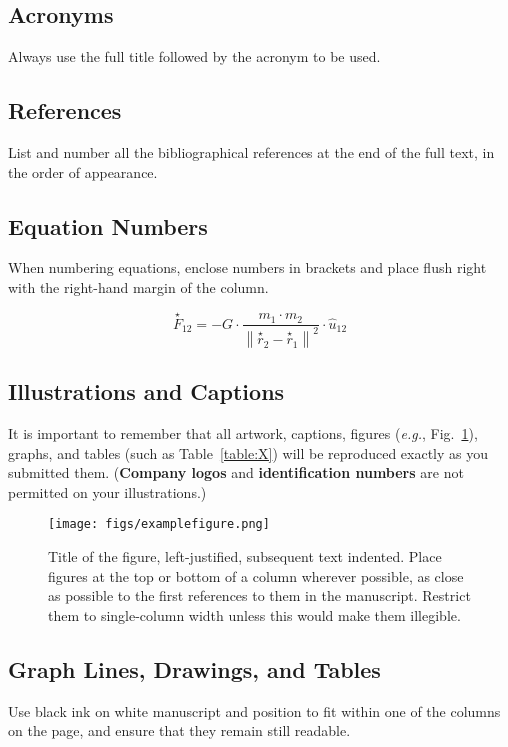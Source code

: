 \documentclass[fleqn]{iac}
\begin{document}
\subsection{Acronyms}
Always use the full title followed by the acronym to be used.

\subsection{References}
List and number all the bibliographical references at the end of the full text, in the order of appearance.\cite{IAFSecretariat2014}

\subsection{Equation Numbers}
When numbering equations, enclose numbers in brackets and place flush right with the right-hand margin of the column.

\begin{equation}
\stackrel{\star}{F}_{12} = -G \cdot \frac{ m_1 \cdot m_2 }{ \left\|\stackrel{\star}{r}_2 - \stackrel{\star}{r}_1\right\|^2 } \cdot \hat{u}_{12}
\end{equation}

\subsection{Illustrations and Captions}
It is important to remember that all artwork, captions, figures (\textit{e.g.}, Fig.~\ref{fig:X}), graphs, and tables (such as Table~\ref{table:X}) will be reproduced exactly as you submitted them. (\textbf{Company logos} and \textbf{identification numbers} are not permitted on your illustrations.)

\begin{figure}
\texttt{[image: figs/examplefigure.png]}
\caption{\label{fig:X}Title of the figure, left-justified, subsequent text indented. Place figures at the top or bottom of a column wherever possible, as close as possible to the first references to them in the manuscript. Restrict them to single-column width unless this would make them illegible.} 
\end{figure}

\subsection{Graph Lines, Drawings, and Tables}
Use black ink on white manuscript and position to fit within one of the columns on the page, and ensure that they remain still readable.
\end{document}
